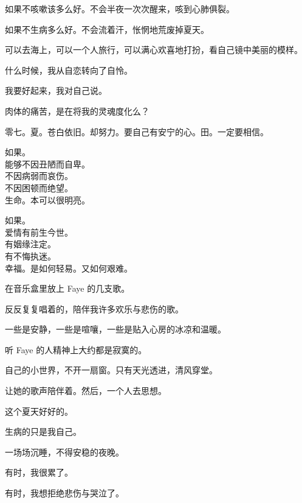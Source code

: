 	\endwriting



		如果不咳嗽该多么好。不会半夜一次次醒来，咳到心肺俱裂。\par
		如果不生病多么好。不会流着汗，怅惘地荒废掉夏天。\par
		可以去海上，可以一个人旅行，可以满心欢喜地打扮，看自己镜中美丽的模样。\par
		什么时候，我从自恋转向了自怜。\par
		我要好起来，我对自己说。\par
		肉体的痛苦，是在将我的灵魂度化么？

	\endwriting



		零七。夏。苍白依旧。却努力。要自己有安宁的心。田。一定要相信。

		\longpoem{}{}{}
			如果。\\
			能够不因丑陋而自卑。\\
			不因病弱而哀伤。\\
			不因困顿而绝望。\\
			生命。本可以很明亮。

			如果。\\
			爱情有前生今世。\\
			有姻缘注定。\\
			有不悔执迷。\\
			幸福。是如何轻易。又如何艰难。
		\endlongpoem

	\endwriting



		在音乐盒里放上 Faye 的几支歌。\par
		反反复复唱着的，陪伴我许多欢乐与悲伤的歌。\par
		一些是安静，一些是喧嚷，一些是贴入心房的冰凉和温暖。\par
		听 Faye 的人精神上大约都是寂寞的。\par
		自己的小世界，不开一扇窗。只有天光透进，清风穿堂。\par
		让她的歌声陪伴着。然后，一个人去思想。

		\vspace{1em}
		这个夏天好好的。\par
		生病的只是我自己。\par
		一场场沉睡，不得安稳的夜晚。\par
		有时，我很累了。\par
		有时，我想拒绝悲伤与哭泣了。

